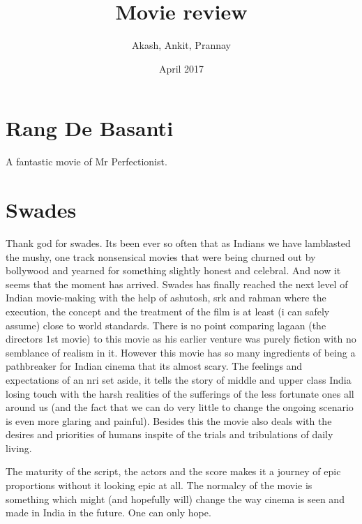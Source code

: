 \documentclass{article}
\title{Movie review}
\author{Akash, Ankit, Prannay}
\date{April 2017}
\begin{document}
\maketitle

\section*{Rang De Basanti}
A fantastic movie of Mr Perfectionist.

\section*{Swades}

Thank god for swades. Its been ever so often that as Indians we have lamblasted the mushy, one track nonsensical movies that were being churned out by bollywood and yearned for something slightly honest and celebral. And now it seems that the moment has arrived. Swades has finally reached the next level of Indian movie-making with the help of ashutosh, srk and rahman where the execution, the concept and the treatment of the film is at least (i can safely assume) close to world standards. There is no point comparing lagaan (the directors 1st movie) to this movie as his earlier venture was purely fiction with no semblance of realism in it. However this movie has so many ingredients of being a pathbreaker for Indian cinema that its almost scary. The feelings and expectations of an nri set aside, it tells the story of middle and upper class India losing touch with the harsh realities of the sufferings of the less fortunate ones all around us (and the fact that we can do very little to change the ongoing scenario is even more glaring and painful). Besides this the movie also deals with the desires and priorities of humans inspite of the trials and tribulations of daily living.

The maturity of the script, the actors and the score makes it a journey of epic proportions without it looking epic at all. The normalcy of the movie is something which might (and hopefully will) change the way cinema is seen and made in India in the future. One can only hope.
\end{document}
